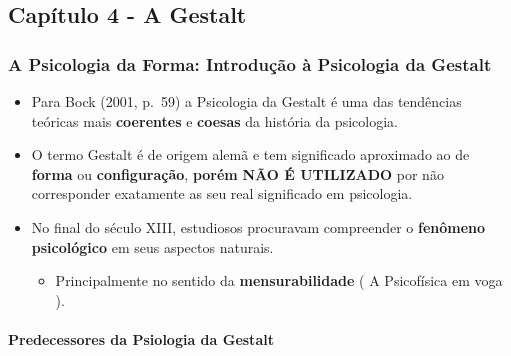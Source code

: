 \documentclass[
]{book}
\providecommand{\tightlist}{%
  \setlength{\itemsep}{0pt}\setlength{\parskip}{0pt}}
\begin{document}
\hypertarget{capuxedtulo-4---a-gestalt}{%
\subsection{Capítulo 4 - A Gestalt}\label{capuxedtulo-4---a-gestalt}}

\hypertarget{a-psicologia-da-forma-introduuxe7uxe3o-uxe0-psicologia-da-gestalt}{%
\subsubsection{A Psicologia da Forma: Introdução à Psicologia da Gestalt}\label{a-psicologia-da-forma-introduuxe7uxe3o-uxe0-psicologia-da-gestalt}}

\begin{itemize}
\tightlist
\item
  Para Bock (2001, p.~59) a Psicologia da Gestalt é uma das tendências teóricas mais \textbf{coerentes} e \textbf{coesas} da história da psicologia.
\item
  O termo Gestalt é de origem alemã e tem significado aproximado ao de \textbf{forma} ou \textbf{configuração}, \textbf{porém} \textbf{NÃO É UTILIZADO} por não corresponder exatamente as seu real significado em psicologia.
\item
  No final do século XIII, estudiosos procuravam compreender o \textbf{fenômeno psicológico} em seus aspectos naturais.

  \begin{itemize}
  \tightlist
  \item
    Principalmente no sentido da \textbf{mensurabilidade} ( A Psicofísica em voga ).
  \end{itemize}
\end{itemize}

\hypertarget{predecessores-da-psiologia-da-gestalt}{%
\paragraph{Predecessores da Psiologia da Gestalt}\label{predecessores-da-psiologia-da-gestalt}}
\end{document}
